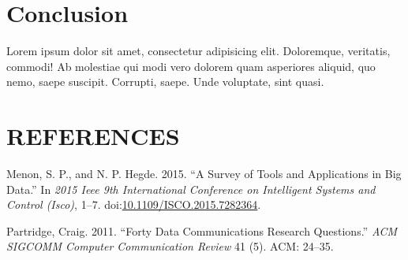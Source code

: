 \chapter{Conclusion}\label{conclusion}

Lorem ipsum dolor sit amet, consectetur adipisicing elit. Doloremque,
veritatis, commodi! Ab molestiae qui modi vero dolorem quam asperiores
aliquid, quo nemo, saepe suscipit. Corrupti, saepe. Unde voluptate, sint
quasi.

\chapter*{REFERENCES}\label{references}

\hypertarget{refs}{}
\hypertarget{ref-7282364}{}
Menon, S. P., and N. P. Hegde. 2015. ``A Survey of Tools and
Applications in Big Data.'' In \emph{2015 Ieee 9th International
Conference on Intelligent Systems and Control (Isco)}, 1--7.
doi:\href{https://doi.org/10.1109/ISCO.2015.7282364}{10.1109/ISCO.2015.7282364}.

\hypertarget{ref-partridge2011forty}{}
Partridge, Craig. 2011. ``Forty Data Communications Research
Questions.'' \emph{ACM SIGCOMM Computer Communication Review} 41 (5).
ACM: 24--35.
